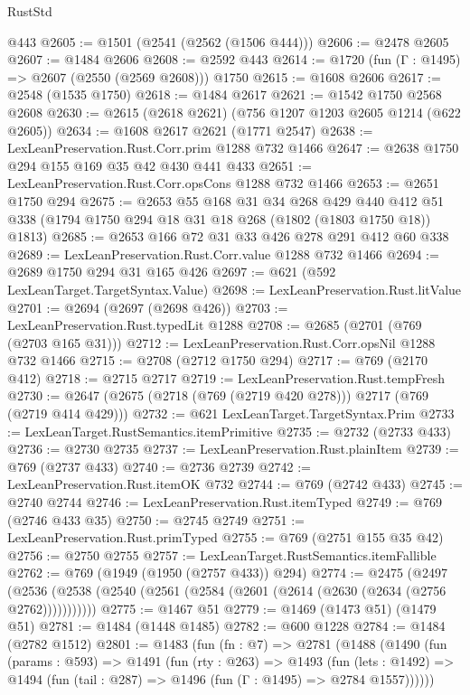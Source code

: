 \begin{lexlean}{RustStd}
\begin{coremodule}
    @443
@2605 := @1501 (@2541 (@2562 (@1506 @444)))
@2606 := @2478 @2605
@2607 := @1484 @2606
@2608 := @2592 @443
@2614 := @1720 (fun (Γ : @1495) => @2607 (@2550 (@2569 @2608))) @1750
@2615 := @1608 @2606
@2617 := @2548 (@1535 @1750)
@2618 := @1484 @2617
@2621 := @1542 @1750 @2568 @2608
@2630 := @2615 (@2618 @2621) (@756 @1207 @1203 @2605 @1214 (@622 @2605))
@2634 := @1608 @2617 @2621 (@1771 @2547)
@2638 := LexLeanPreservation.Rust.Corr.prim @1288 @732 @1466
@2647 := @2638 @1750 @294 @155 @169 @35 @42 @430 @441 @433
@2651 := LexLeanPreservation.Rust.Corr.opsCons @1288 @732 @1466
@2653 := @2651 @1750 @294
@2675 := @2653
    @55
    @168
    @31
    @34
    @268
    @429
    @440
    @412
    @51
    @338
    (@1794 @1750 @294 @18 @31 @18 @268 (@1802 (@1803 @1750 @18)) @1813)
@2685 := @2653 @166 @72 @31 @33 @426 @278 @291 @412 @60 @338
@2689 := LexLeanPreservation.Rust.Corr.value @1288 @732 @1466
@2694 := @2689 @1750 @294 @31 @165 @426
@2697 := @621 (@592 LexLeanTarget.TargetSyntax.Value)
@2698 := LexLeanPreservation.Rust.litValue
@2701 := @2694 (@2697 (@2698 @426))
@2703 := LexLeanPreservation.Rust.typedLit @1288
@2708 := @2685 (@2701 (@769 (@2703 @165 @31)))
@2712 := LexLeanPreservation.Rust.Corr.opsNil @1288 @732 @1466
@2715 := @2708 (@2712 @1750 @294)
@2717 := @769 (@2170 @412)
@2718 := @2715 @2717
@2719 := LexLeanPreservation.Rust.tempFresh
@2730 := @2647 (@2675 (@2718 (@769 (@2719 @420 @278))) @2717 (@769 (@2719 @414 @429)))
@2732 := @621 LexLeanTarget.TargetSyntax.Prim
@2733 := LexLeanTarget.RustSemantics.itemPrimitive
@2735 := @2732 (@2733 @433)
@2736 := @2730 @2735
@2737 := LexLeanPreservation.Rust.plainItem
@2739 := @769 (@2737 @433)
@2740 := @2736 @2739
@2742 := LexLeanPreservation.Rust.itemOK @732
@2744 := @769 (@2742 @433)
@2745 := @2740 @2744
@2746 := LexLeanPreservation.Rust.itemTyped
@2749 := @769 (@2746 @433 @35)
@2750 := @2745 @2749
@2751 := LexLeanPreservation.Rust.primTyped
@2755 := @769 (@2751 @155 @35 @42)
@2756 := @2750 @2755
@2757 := LexLeanTarget.RustSemantics.itemFallible
@2762 := @769 (@1949 (@1950 (@2757 @433)) @294)
@2774 := @2475
    (@2497 (@2536 (@2538 (@2540 (@2561 (@2584 (@2601 (@2614 (@2630 (@2634 (@2756 @2762)))))))))))
@2775 := @1467 @51
@2779 := @1469 (@1473 @51) (@1479 @51)
@2781 := @1484 (@1448 @1485)
@2782 := @600 @1228
@2784 := @1484 (@2782 @1512)
@2801 := @1483
    (fun (fn : @7) =>
    @2781
      (@1488
        (@1490
          (fun (params : @593) =>
          @1491
            (fun (rty : @263) =>
            @1493
              (fun (lets : @1492) =>
              @1494 (fun (tail : @287) => @1496 (fun (Γ : @1495) => @2784 @1557))))))

\end{coremodule}
\end{lexlean}
